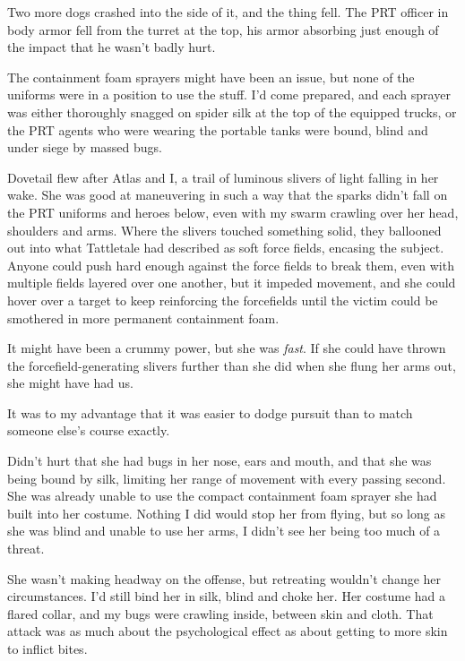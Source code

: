 Two more dogs crashed into the side of it, and the thing fell.  The PRT officer in body armor fell from the turret at the top, his armor absorbing just enough of the impact that he wasn't badly hurt.



The containment foam sprayers might have been an issue, but none of the uniforms were in a position to use the stuff.  I'd come prepared, and each sprayer was either thoroughly snagged on spider silk at the top of the equipped trucks, or the PRT agents who were wearing the portable tanks were bound, blind and under siege by massed bugs.



Dovetail flew after Atlas and I, a trail of luminous slivers of light falling in her wake.  She was good at maneuvering in such a way that the sparks didn't fall on the PRT uniforms and heroes below, even with my swarm crawling over her head, shoulders and arms.  Where the slivers touched something solid, they ballooned out into what Tattletale had described as soft force fields, encasing the subject.  Anyone could push hard enough against the force fields to break them, even with multiple fields layered over one another, but it impeded movement, and she could hover over a target to keep reinforcing the forcefields until the victim could be smothered in more permanent containment foam.



It might have been a crummy power, but she was \emph{fast}.  If she could have thrown the forcefield-generating slivers further than she did when she flung her arms out, she might have had us.



It was to my advantage that it was easier to dodge pursuit than to match someone else's course exactly.



Didn't hurt that she had bugs in her nose, ears and mouth, and that she was being bound by silk, limiting her range of movement with every passing second.  She was already unable to use the compact containment foam sprayer she had built into her costume.  Nothing I did would stop her from flying, but so long as she was blind and unable to use her arms, I didn't see her being too much of a threat.



She wasn't making headway on the offense, but retreating wouldn't change her circumstances.  I'd still bind her in silk, blind and choke her.  Her costume had a flared collar, and my bugs were crawling inside, between skin and cloth.  That attack was as much about the psychological effect as about getting to more skin to inflict bites.



